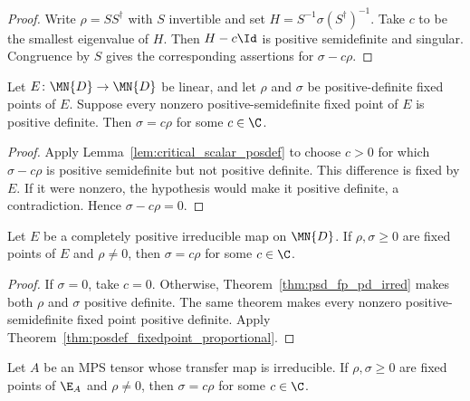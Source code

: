 \begin{proof}\leanok
    Write $\rho=SS^\dagger$ with $S$ invertible and set
    $H=S^{-1}\sigma(S^\dagger)^{-1}$. Take $c$ to be the smallest eigenvalue
    of $H$. Then $H-c\Id$ is positive semidefinite and singular. Congruence by
    $S$ gives the corresponding assertions for $\sigma-c\rho$.
\end{proof}

\begin{theorem}
    \label{thm:posdef_fixedpoint_proportional}
    \leanok
    Let $E\colon\MN{D}\to\MN{D}$ be linear, and let $\rho$ and $\sigma$ be
    positive-definite fixed points of $E$. Suppose every nonzero
    positive-semidefinite fixed point of $E$ is positive definite. Then
    $\sigma=c\rho$ for some $c\in\C$.
\end{theorem}

\begin{proof}\leanok
    Apply Lemma~\ref{lem:critical_scalar_posdef} to choose $c>0$ for which
    $\sigma-c\rho$ is positive semidefinite but not positive definite. This
    difference is fixed by $E$. If it were nonzero, the hypothesis would make
    it positive definite, a contradiction. Hence $\sigma-c\rho=0$.
\end{proof}

\begin{theorem}
    \label{thm:psd_fp_unique_irred_cp}
    \leanok
    Let $E$ be a completely positive irreducible map on $\MN{D}$. If
    $\rho,\sigma\geq0$ are fixed points of $E$ and $\rho\neq0$, then
    $\sigma=c\rho$ for some $c\in\C$.
\end{theorem}

\begin{proof}\leanok
    If $\sigma=0$, take $c=0$. Otherwise,
    Theorem~\ref{thm:psd_fp_pd_irred} makes both $\rho$ and $\sigma$
    positive definite. The same theorem makes every nonzero
    positive-semidefinite fixed point positive definite. Apply
    Theorem~\ref{thm:posdef_fixedpoint_proportional}.
\end{proof}

\begin{theorem}
    \label{thm:psd_fp_unique_irred}
    \leanok
    Let $A$ be an MPS tensor whose transfer map is irreducible. If
    $\rho,\sigma\geq0$ are fixed points of $\E_A$ and $\rho\neq0$, then
    $\sigma=c\rho$ for some $c\in\C$.
\end{theorem}


